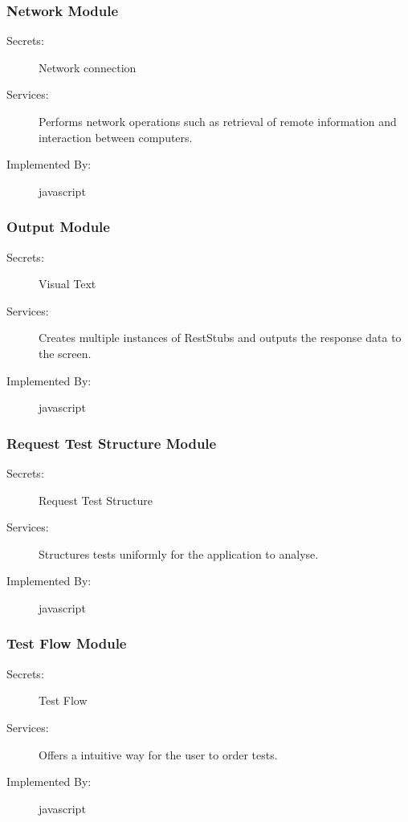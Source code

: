 \documentclass[12pt, titlepage]{article}
\begin{document}
\subsubsection{Network Module}
\begin{description}
\item[Secrets:] Network connection
\item[Services:] Performs network operations such as retrieval of remote information and interaction between computers.
\item[Implemented By:] javascript
\end{description}

\subsubsection{Output Module}
\begin{description}
\item[Secrets:] Visual Text
\item[Services:]Creates multiple instances of RestStubs and outputs the response data to the screen.
\item[Implemented By:] javascript
\end{description}

\subsubsection{Request Test Structure Module}
\begin{description}
\item[Secrets:] Request Test Structure
\item[Services:] Structures tests uniformly for the application to analyse.
\item[Implemented By:] javascript
\end{description}

\subsubsection{Test Flow Module}
\begin{description}
\item[Secrets:] Test Flow
\item[Services:] Offers a intuitive way for the user to order tests.
\item[Implemented By:] javascript
\end{description}
\end{document}
